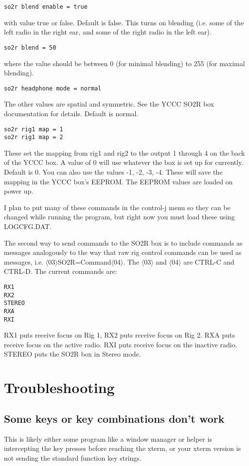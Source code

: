 \documentclass[12pt]{article}
\begin{document}
\begin{verbatim}
so2r blend enable = true
\end{verbatim}
with value true or false. Default is false. This turns on blending (i.e.
some of the left radio in the right ear, and some of the right radio
in the left ear).

\begin{verbatim}
so2r blend = 50
\end{verbatim}
where the value should be between 0 (for minimal blending) to 255
(for maximal blending).

\begin{verbatim}
so2r headphone mode = normal
\end{verbatim}
The other values are spatial and symmetric. See the YCCC SO2R box documentation
for details. Default is normal.

\begin{verbatim}
so2r rig1 map = 1
so2r rig1 map = 2
\end{verbatim}

These set the mapping from rig1 and rig2 to the output 1 through 4 on
the back of the YCCC box. A value of 0 will use whatever the box is
set up for currently. Default is 0.
You can also use the values -1, -2, -3, -4. These will save the mapping
in the YCCC box's EEPROM. The EEPROM values are loaded on power up.

I plan to put many of these commands in the control-j menu so
they can be changed while running the program, but right now you
must load these using LOGCFG.DAT.

The second way to send commands to the SO2R box is to
include commands as messages analogously to the way that
raw rig control commands can be used as messages, i.e.
$\langle$03$\rangle$SO2R=Command$\langle$04$\rangle$.
The $\langle$03$\rangle$ and $\langle$04$\rangle$  are CTRL-C and CTRL-D.
The current commands are:
\begin{verbatim}
RX1
RX2
STEREO
RXA
RXI
\end{verbatim}
RX1 puts receive focus on Rig 1, RX2 puts receive focus on Rig 2.
RXA puts receive focus on the active radio.
RXI puts receive focus on the inactive radio.
STEREO puts the SO2R box in Stereo mode. 

\section{Troubleshooting}
\subsection{Some keys or key combinations don't work}
This is likely either some program like a window manager or helper
is intercepting the key presses before reaching the xterm, or your xterm
version is not sending the standard function key strings.
\end{document}
